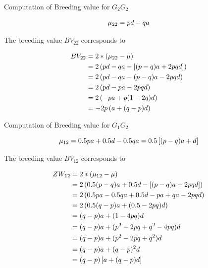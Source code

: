 \documentclass[ignorenonframetext,]{beamer}
\begin{document}
\begin{frame}{Computation of Breeding value for \(G_2G_2\)}
\protect\hypertarget{computation-of-breeding-value-for-g_2g_2}{}

\begin{equation}
\mu_{22} = pd - qa \notag
\end{equation}

The breeding value \(BV_{22}\) corresponds to

\begin{align}
BV_{22} &=   2*(\mu_{22} - \mu)  \notag \\
        &=   2\left(pd - qa - \left[(p - q)a + 2pqd \right] \right) \notag \\
        &=   2\left(pd - qa - (p - q)a - 2pqd \right) \notag \\
        &=   2\left(pd - pa - 2pqd\right) \notag \\
        &=   2\left(-pa + p(1-2q)d\right) \notag \\
        &=  -2p\left(a + (q - p)d\right) \notag
\end{align}

\end{frame}

\begin{frame}{Computation of Breeding value for \(G_1G_2\)}
\protect\hypertarget{computation-of-breeding-value-for-g_1g_2}{}

\begin{equation}
\mu_{12} = 0.5pa + 0.5d - 0.5qa = 0.5\left[(p-q)a + d \right] \notag
\end{equation}

The breeding value \(BV_{12}\) corresponds to

\begin{align}
ZW_{12} &=   2*(\mu_{12} - \mu) \notag \\
        &=   2\left(0.5(p-q)a + 0.5d - \left[(p - q)a + 2pqd \right] \right) \notag \\
        &=   2\left(0.5pa - 0.5qa + 0.5d - pa + qa - 2pqd \right) \notag \\
        &=   2\left(0.5(q-p)a + (0.5 - 2pq)d \right) \notag \\
        &=   (q-p)a + (1-4pq)d  \notag \\
        &=   (q-p)a + (p^2 + 2pq + q^2 -4pq)d  \notag \\
        &=   (q-p)a + (p^2 - 2pq + q^2)d  \notag \\
        &=   (q-p)a + (q - p)^2d   \notag \\
        &=   (q-p)\left[a + (q-p)d \right] \notag
\end{align}

\end{frame}
\end{document}
